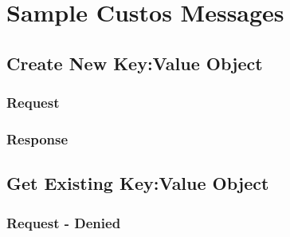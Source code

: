 \chapter{Sample Custos Messages}
\label{appx:messages}

\newpage
\section{Create New Key:Value Object}

\subsection{Request}







\newpage
\subsection{Response}



\newpage
\section{Get Existing Key:Value Object}

\subsection{Request - Denied}





